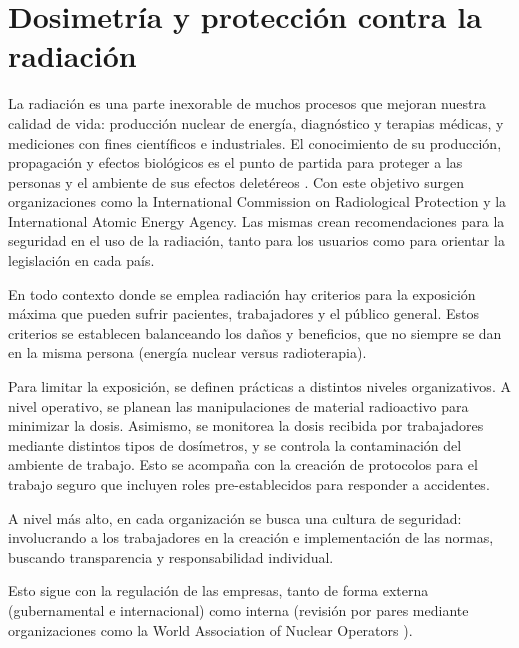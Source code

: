 \section{Dosimetría y protección contra la radiación}
La radiación es una parte inexorable de muchos procesos que mejoran nuestra
calidad de vida:
producción nuclear de energía, 
diagnóstico y terapias médicas, 
y mediciones con fines científicos e industriales.
El conocimiento de su producción, propagación y efectos biológicos
es el punto de partida para 
proteger a las personas y el ambiente de sus efectos deletéreos
\cite{iaea_radiation_????}.
Con este objetivo surgen organizaciones como la International Commission on
Radiological Protection\cite{_icrp_????} y la International Atomic Energy
Agency\cite{iaea_official_????}.
Las mismas crean recomendaciones para la seguridad en el uso de la radiación,
tanto para los usuarios como para orientar la legislación en cada país.

En todo contexto donde se emplea radiación 
hay criterios para la exposición máxima 
que pueden sufrir pacientes,
trabajadores y el público general.
Estos criterios se establecen balanceando los daños y beneficios,
que no siempre se dan en la misma persona 
(energía nuclear versus radioterapia).

Para limitar la exposición,
se definen prácticas a distintos niveles organizativos.
A nivel operativo, se planean las manipulaciones de material radioactivo
para minimizar la dosis.
Asimismo, se monitorea la dosis recibida por trabajadores 
mediante distintos tipos de dosímetros,
y se controla la contaminación del ambiente de trabajo.
Esto se acompaña con la creación de protocolos para el trabajo seguro
que incluyen roles pre-establecidos para responder a accidentes.

A nivel más alto, en cada organización se busca una cultura de seguridad:
involucrando a los trabajadores en la creación e implementación de las normas,
buscando transparencia y responsabilidad individual. 

Esto sigue con 
la regulación de las empresas, tanto de forma externa 
(gubernamental e internacional) como interna (revisión por pares mediante
organizaciones como la World Association of Nuclear Operators
\cite{washington_practice_1997}).
